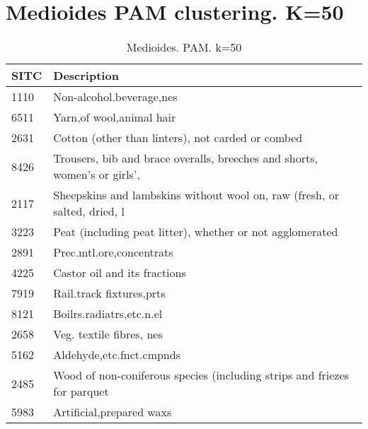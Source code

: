 \documentclass[class=article, crop=false]{standalone}
\begin{document}
\pagebreak

\section{Medioides PAM clustering. K=50}

\begin{longtable}{ll}
	\hline
	\textbf{SITC} & \textbf{Description}                                                      \\ \hline
	\endhead
	\hline
	\endfoot
	\caption{Medioides. PAM. k=50}
	\label{tabla:pam50}
	\endlastfoot
	1110          & Non-alcohol.beverage,nes                                                  \\
	6511          & Yarn,of wool,animal hair                                                  \\
	2631          & Cotton (other than linters), not carded or combed                         \\
	8426          & Trousers, bib and brace overalls, breeches and shorts, women's or girls', \\
	2117          & Sheepskins and lambskins without wool on, raw (fresh, or salted, dried, l \\
	3223          & Peat (including peat litter), whether or not agglomerated                 \\
	2891          & Prec.mtl.ore,concentrats                                                  \\
	4225          & Castor oil and its fractions                                              \\
	7919          & Rail.track fixtures,prts                                                  \\
	8121          & Boilrs.radiatrs,etc.n.el                                                  \\
	2658          & Veg. textile fibres, nes                                                  \\
	5162          & Aldehyde,etc.fnct.cmpnds                                                  \\
	2485          & Wood of non-coniferous species (including strips and friezes for parquet  \\
	5983          & Artificial,prepared waxs                                                  \\

\end{longtable}
\end{document}
